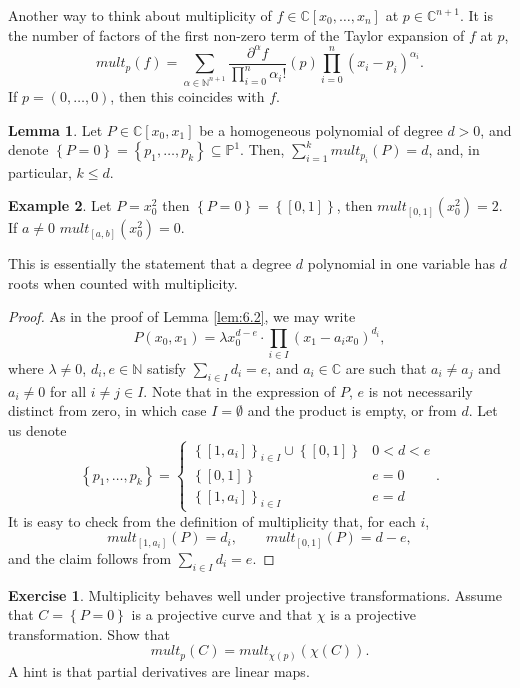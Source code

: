 \documentclass{article}
\newcommand{\N}{\mathbb{N}}
\newcommand{\C}{\mathbb{C}}
\renewcommand{\P}{\mathbb{P}}
\newcommand{\rb}[1]{\left( #1 \right)}
\renewcommand{\sb}[1]{\left[ #1 \right]}
\newcommand{\cb}[1]{\left\{ #1 \right\}}
\theoremstyle{definition}\newtheorem{definition}{Definition}[section]
\theoremstyle{definition}\newtheorem{notation}[definition]{Notation}
\theoremstyle{definition}\newtheorem{remark}[definition]{Remark}
\theoremstyle{definition}\newtheorem{example}[definition]{Example}
\theoremstyle{definition}\newtheorem{fact}{Fact}
\theoremstyle{definition}\newtheorem{exercise}{Exercise}
\newtheorem{lemma}[definition]{Lemma}
\begin{document}
Another way to think about multiplicity of $ f \in \C\sb{x_0, \dots, x_n} $ at $ p \in \C^{n + 1} $. It is the number of factors of the first non-zero term of the Taylor expansion of $ f $ at $ p $,
$$ mult_p\rb{f} = \sum_{\alpha \in \N^{n + 1}} \dfrac{\partial^\alpha f}{\prod_{i = 0}^n \alpha_i!}\rb{p}\prod_{i = 0}^n \rb{x_i - p_i}^{\alpha_i}. $$
If $ p = \rb{0, \dots, 0} $, then this coincides with $ f $.

\begin{lemma}
\label{lem:11.5}
Let $ P \in \C\sb{x_0, x_1} $ be a homogeneous polynomial of degree $ d > 0 $, and denote $ \cb{P = 0} = \cb{p_1, \dots, p_k} \subseteq \P^1 $. Then, $ \sum_{i = 1}^k mult_{p_i}\rb{P} = d $, and, in particular, $ k \le d $.
\end{lemma}

\begin{example}
Let $ P = x_0^2 $ then $ \cb{P = 0} = \cb{\sb{0, 1}} $, then $ mult_{\sb{0, 1}}\rb{x_0^2} = 2 $. If $ a \ne 0 $ $ mult_{\sb{a, b}}\rb{x_0^2} = 0 $.
\end{example}

This is essentially the statement that a degree $ d $ polynomial in one variable has $ d $ roots when counted with multiplicity.

\begin{proof}
As in the proof of Lemma \ref{lem:6.2}, we may write
$$ P\rb{x_0, x_1} = \lambda x_0^{d - e} \cdot \prod_{i \in I} \rb{x_1 - a_ix_0}^{d_i}, $$
where $ \lambda \ne 0 $, $ d_i, e \in \N $ satisfy $ \sum_{i \in I} d_i = e $, and $ a_i \in \C $ are such that $ a_i \ne a_j $ and $ a_i \ne 0 $ for all $ i \ne j \in I $. Note that in the expression of $ P $, $ e $ is not necessarily distinct from zero, in which case $ I = \emptyset $ and the product is empty, or from $ d $. Let us denote
$$ \cb{p_1, \dots, p_k} = \begin{cases} \cb{\sb{1, a_i}}_{i \in I} \cup \cb{\sb{0, 1}} & 0 < d < e \\ \cb{\sb{0, 1}} & e = 0 \\ \cb{\sb{1, a_i}}_{i \in I} & e = d \end{cases}. $$
It is easy to check from the definition of multiplicity that, for each $ i $,
$$ mult_{\sb{1, a_i}}\rb{P} = d_i, \qquad mult_{\sb{0, 1}}\rb{P} = d - e, $$
and the claim follows from $ \sum_{i \in I} d_i = e $.
\end{proof}

\begin{exercise}
\label{ex:33}
Multiplicity behaves well under projective transformations. Assume that $ C = \cb{P = 0} $ is a projective curve and that $ \chi $ is a projective transformation. Show that
$$ mult_p\rb{C} = mult_{\chi\rb{p}}\rb{\chi\rb{C}}. $$
A hint is that partial derivatives are linear maps.
\end{exercise}
\end{document}
